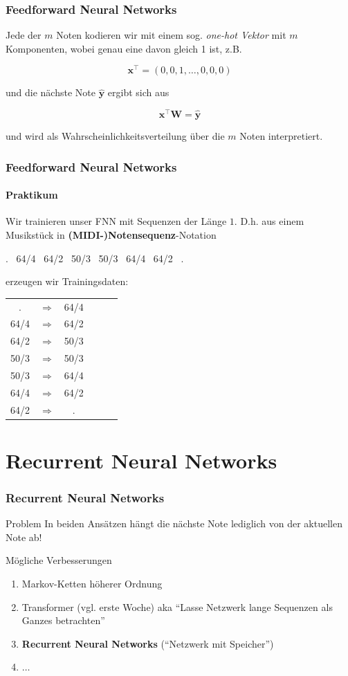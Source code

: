 \documentclass[aspectratio=169]{beamer}
\begin{document}
\begin{frame}
	\frametitle{Feedforward Neural Networks}
	Jede der $m$ Noten kodieren wir mit einem sog. \textit{one-hot Vektor} mit $m$ Komponenten, wobei genau eine davon gleich 1 ist, z.B.
	
	$$\mathbf{x}^\top = (0, 0, 1, \ldots, 0, 0, 0)$$
	
	und die nächste Note $\mathbf{\hat{y}}$ ergibt sich aus
	
	$$\mathbf{x}^\top \mathbf{W} = \mathbf{\hat{y}}$$
	
	und wird als Wahrscheinlichkeitsverteilung über die $m$ Noten interpretiert.
		
\end{frame}


\begin{frame}
	\frametitle{Feedforward Neural Networks}
	\framesubtitle{Praktikum}
	Wir trainieren unser FNN mit Sequenzen der Länge $1$. D.h. aus einem Musikstück in \textbf{(MIDI-)Notensequenz}-Notation
	\begin{center}
		. \ 64/4 \ 64/2 \ 50/3 \ 50/3 \ 64/4 \ 64/2 \ .
	\end{center}
	erzeugen wir Trainingsdaten:\\
	\begin{center}
			\begin{tabular}{c c c c c c}
			. & $\Rightarrow$ & 64/4 \\
			64/4 & $\Rightarrow$ & 64/2 \\
			64/2 & $\Rightarrow$ & 50/3 \\
			50/3 & $\Rightarrow$ & 50/3 \\
			50/3 & $\Rightarrow$ & 64/4 \\
			64/4 & $\Rightarrow$ & 64/2 \\
			64/2 & $\Rightarrow$ & .
		\end{tabular}
	\end{center}
\end{frame}

\section{Recurrent Neural Networks}

\begin{frame}
	\frametitle{Recurrent Neural Networks}
	\begin{block}{Problem}
	 	In beiden Ansätzen hängt die nächste Note lediglich von der aktuellen Note ab!
	\end{block}
	\vspace{1cm}
	\begin{block}{Mögliche Verbesserungen}
		\begin{enumerate}[label=$\bullet$]
			\item Markov-Ketten höherer Ordnung
			\item Transformer (vgl. erste Woche) aka ``Lasse Netzwerk lange Sequenzen als Ganzes betrachten''
			\item \textbf{Recurrent Neural Networks} (``Netzwerk mit Speicher'')
			\item $\dots$
		\end{enumerate}
	\end{block}
\end{frame}
\end{document}
